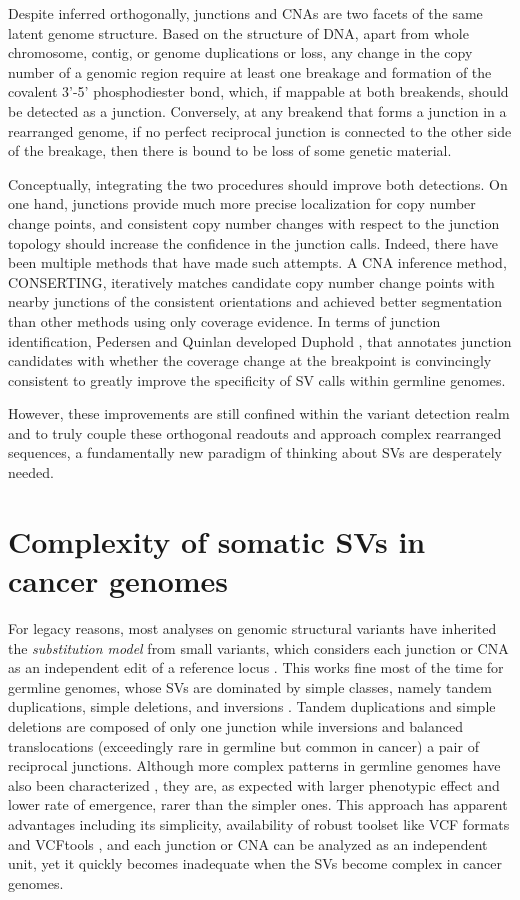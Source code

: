 \documentclass[phd,tocprelim]{cornell}
\begin{document}
Despite inferred orthogonally, junctions and CNAs are two facets of the same latent genome structure. Based on the structure of DNA, apart from whole chromosome, contig, or genome duplications or loss, any change in the copy number of a genomic region require at least one breakage and formation of the covalent 3'-5' phosphodiester bond, which, if mappable at both breakends, should be detected as a junction. Conversely, at any breakend that forms a junction in a rearranged genome, if no perfect reciprocal junction is connected to the other side of the breakage, then there is bound to be loss of some genetic material.

Conceptually, integrating the two procedures should improve both detections. On one hand, junctions provide much more precise localization for copy number change points, and consistent copy number changes with respect to the junction topology should increase the confidence in the junction calls. Indeed, there have been multiple methods that have made such attempts. A CNA inference method, CONSERTING\cite{Chen2015-sw}, iteratively matches candidate copy number change points with nearby junctions of the consistent orientations and achieved better segmentation than other methods using only coverage evidence. In terms of junction identification, Pedersen and Quinlan developed Duphold \cite{Pedersen2019-pp}, that annotates junction candidates with whether the coverage change at the breakpoint is convincingly consistent to greatly improve the specificity of SV calls within germline genomes.

However, these improvements are still confined within the variant detection realm and to truly couple these orthogonal readouts and approach complex rearranged sequences, a fundamentally new paradigm of thinking about SVs are desperately needed.

\section{Complexity of somatic SVs in cancer genomes}
For legacy reasons, most analyses on genomic structural variants have inherited the \textit{substitution model} from small variants, which considers each junction or CNA as an independent edit of a reference locus \cite{Li2008-su,Li2009-fv}. This works fine most of the time for germline genomes, whose SVs are dominated by simple classes, namely tandem duplications, simple deletions, and inversions \cite{Collins2020-iv}. Tandem duplications and simple deletions are composed of only one junction while inversions and balanced translocations (exceedingly rare in germline but common in cancer) a pair of reciprocal junctions. Although more complex patterns in germline genomes have also been characterized \cite{Carvalho2011-lb,Collins2020-iv}, they are, as expected with larger phenotypic effect and lower rate of emergence, rarer than the simpler ones. This approach has apparent advantages including its simplicity, availability of robust toolset like VCF formats and VCFtools \cite{Danecek2011-yi}, and each junction or CNA can be analyzed as an independent unit, yet it quickly becomes inadequate when the SVs become complex in cancer genomes.
\end{document}
